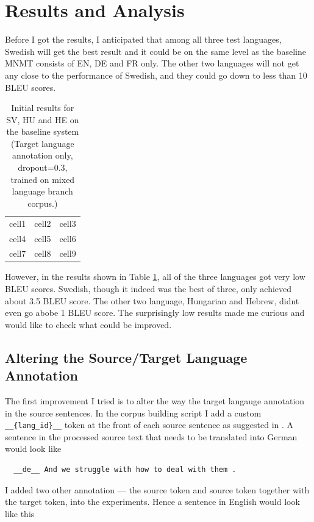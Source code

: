 \documentclass[thesis,fonts=libertine]{cluu}
\begin{document}
\section{Results and Analysis}

Before I got the results, I anticipated that among all three test languages, Swedish will get the best result and it could be on the same level as the baseline MNMT consists of EN, DE and FR only. The other two languages will not get any close to the performance of Swedish, and they could go down to less than 10 BLEU scores.

\begin{table}
  \centering
  \begin{tabular}{c c c}
    cell1 & cell2 & cell3 \\ 
    cell4 & cell5 & cell6 \\  
    cell7 & cell8 & cell9 
  \end{tabular}
  \caption{Initial results for SV, HU and HE on the baseline system (Target language annotation only, dropout=0.3, trained on mixed language branch corpus.)}
  \label{table:initial_results}
\end{table}

However, in the results shown in Table \ref{table:initial_results}, all of the three languages got very low BLEU scores. Swedish, though it indeed was the best of three, only achieved about 3.5 BLEU score. The other two language, Hungarian and Hebrew, didnt even go abobe 1 BLEU score. The surprisingly low results made me curious and would like to check what could be improved.

\subsection{Altering the Source/Target Language Annotation}

The first improvement I tried is to alter the way the target langauge annotation in the source sentences. In the corpus building script I add a custom \verb|__{lang_id}__| token at the front of each source sentence as suggested in \cite{Johnson:2016aa}. A sentence in the processed source text that needs to be translated into German would look like 

\begin{verbatim}
  __de__ And we struggle with how to deal with them .
\end{verbatim}

I added two other annotation --- the source token and source token together with the target token, into the experiments. Hence a sentence in English would look like this 
\end{document}
